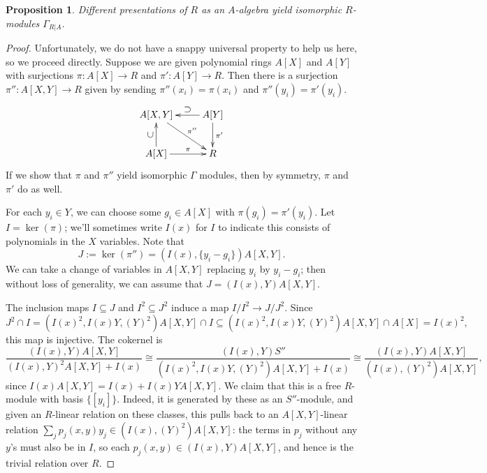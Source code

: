 \documentclass{amsart}[12pt]
\def\ker{\operatorname{ker}}
\numberwithin{equation}{section}
\theoremstyle{plain} %
\newtheorem{prop}[equation]{Proposition}
\theoremstyle{definition}
\theoremstyle{remark}
\begin{document}
\begin{prop} Different presentations of $R$ as an $A$-algebra yield isomorphic $R$-modules $\Gamma_{R|A}$.
\end{prop}
\begin{proof}
Unfortunately, we do not have a snappy universal property to help us here, so we proceed directly. Suppose we are given polynomial rings $A[X]$ and $A[Y]$ with surjections $\pi:A[X]\to R$ and $\pi':A[Y]\to R$. Then there is a surjection $\pi'':A[X,Y]\to R$ given by sending $\pi''(x_i)=\pi(x_i)$ and $\pi''(y_i)=\pi'(y_i)$. 
\[\xymatrix{  A[X,Y] \ar[dr]^-{\pi''} & A[Y] \ar[l]_-{\rotatebox{180}{$\subset$}} \ar[d]^-{\pi'} \\ A[X] \ar[r]^-{\pi}\ar[u]^-{\rotatebox{90}{$\subset$}} & R}\]
If we show that $\pi$ and $\pi''$ yield isomorphic $\Gamma$ modules, then by symmetry, $\pi$ and $\pi'$ do as well.

For each $y_i\in Y$, we can choose some $g_i\in A[X]$ with $\pi(g_i)=\pi'(y_i)$. Let $I=\ker(\pi)$; we'll sometimes write $I(x)$ for $I$ to indicate this consists of polynomials in the $X$ variables. Note that \[J:=\ker(\pi'')=(I(x) , \{ y_i - g_i \})A[X,Y].\] We can take a change of variables in $A[X,Y]$ replacing $y_i$ by $y_i-g_i$; then without loss of generality, we can assume that $J= (I(x),Y)A[X,Y]$. 

The inclusion maps $I\subseteq J$ and $I^2\subseteq J^2$ induce a map $I/I^2 \to J/J^2$. Since 
\[J^2\cap I = (I(x)^2,I(x) Y, (Y)^2)A[X,Y] \cap I \subseteq (I(x)^2,I(x) Y, (Y)^2)A[X,Y] \cap A[X] = I(x)^2,\] this map is injective. The cokernel is 
\[\frac{(I(x),Y)A[X,Y]}{(I(x),Y)^2 A[X,Y] + I(x)}\cong \frac{(I(x),Y)S''}{(I(x)^2,I(x) Y, (Y)^2)A[X,Y] + I(x)}\cong  \frac{(I(x),Y)A[X,Y]}{(I(x),(Y)^2) A[X,Y]},\]
since $I(x)A[X,Y]=I(x) + I(x)YA[X,Y]$. We claim that this is a free $R$-module with basis $\{[y_i]\}$. Indeed, it is generated by these as an $S''$-module, and given an $R$-linear relation on these classes, this pulls back to an $A[X,Y]$-linear relation $\sum_j p_j(x,y) y_j\in (I(x),(Y)^2)A[X,Y]$: the terms in $p_j$ without any $y$'s must also be in $I$, so each $p_j(x,y)\in (I(x),Y)A[X,Y]$, and hence is the trivial relation over $R$.


\end{proof}
\end{document}
